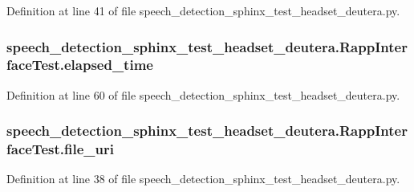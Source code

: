 Definition at line 41 of file speech\-\_\-detection\-\_\-sphinx\-\_\-test\-\_\-headset\-\_\-deutera.\-py.

\hypertarget{classspeech__detection__sphinx__test__headset__deutera_1_1RappInterfaceTest_acb0f6d5f25a2a9fea216ee8996947bf0}{
\subsubsection[{elapsed\-\_\-time}]{\setlength{\rightskip}{0pt plus 5cm}speech\-\_\-detection\-\_\-sphinx\-\_\-test\-\_\-headset\-\_\-deutera.\-Rapp\-Interface\-Test.\-elapsed\-\_\-time}}\label{classspeech__detection__sphinx__test__headset__deutera_1_1RappInterfaceTest_acb0f6d5f25a2a9fea216ee8996947bf0}


Definition at line 60 of file speech\-\_\-detection\-\_\-sphinx\-\_\-test\-\_\-headset\-\_\-deutera.\-py.

\hypertarget{classspeech__detection__sphinx__test__headset__deutera_1_1RappInterfaceTest_aa4d5840c42997eb9b990bc42a4291ce5}{
\subsubsection[{file\-\_\-uri}]{\setlength{\rightskip}{0pt plus 5cm}speech\-\_\-detection\-\_\-sphinx\-\_\-test\-\_\-headset\-\_\-deutera.\-Rapp\-Interface\-Test.\-file\-\_\-uri}}\label{classspeech__detection__sphinx__test__headset__deutera_1_1RappInterfaceTest_aa4d5840c42997eb9b990bc42a4291ce5}


Definition at line 38 of file speech\-\_\-detection\-\_\-sphinx\-\_\-test\-\_\-headset\-\_\-deutera.\-py.

